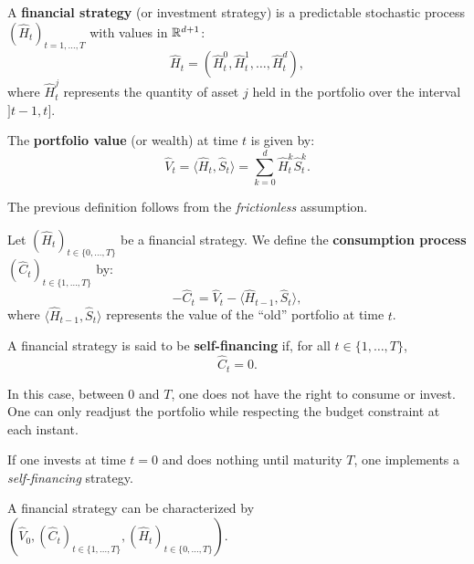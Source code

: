 \begin{definition}
A \textbf{financial strategy} (or investment strategy) is a predictable stochastic process $(\hat H_t)_{t=1,\ldots,T}$ with values in $\mathbb{R}^{d+1}$:
\begin{equation}
\hat H_t = (\hat H_t^0, \hat H_t^1, \ldots, \hat H_t^d),
\end{equation}
where $\hat H_t^j$ represents the quantity of asset $j$ held in the portfolio over the interval $]t-1, t]$.

The \textbf{portfolio value} (or wealth) at time $t$ is given by:
\begin{equation}
\hat V_t = \langle \hat H_t, \hat S_t \rangle = \sum_{k=0}^d \hat H_t^k \hat S_t^k.
\end{equation}
\end{definition}

\begin{remark}
The previous definition follows from the \emph{frictionless} assumption.
\end{remark}

\begin{definition}
Let $(\hat H_t)_{t\in\{0,\ldots,T\}}$ be a financial strategy.  
We define the \textbf{consumption process} $(\hat C_t)_{t\in\{1,\ldots,T\}}$ by:
\[
-\hat C_t = \hat V_t - \langle \hat H_{t-1}, \hat S_t \rangle,
\]
where $\langle \hat H_{t-1}, \hat S_t \rangle$ represents the value of the ``old'' portfolio at time $t$.

A financial strategy is said to be \textbf{self-financing} if, for all $t\in\{1,\ldots,T\}$,
\[
\hat C_t = 0.
\]
\end{definition}

\medskip

In this case, between $0$ and $T$, one does not have the right to consume or invest.  
One can only readjust the portfolio while respecting the budget constraint at each instant.

\begin{example}
If one invests at time $t=0$ and does nothing until maturity $T$, one implements a \emph{self-financing} strategy.
\end{example}

\begin{lemma}
A financial strategy can be characterized by $(\hat V_0, (\hat C_t)_{t\in\{1,\ldots,T\}}, (\hat H_t)_{t\in\{0,\ldots,T\}})$.
\end{lemma}

